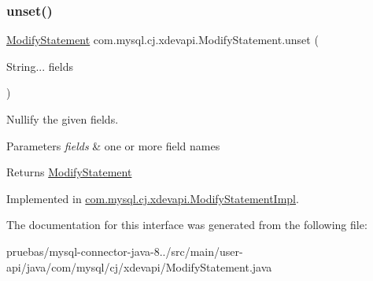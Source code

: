 \subsubsection{\texorpdfstring{unset()}{unset()}}
{\footnotesize\ttfamily \mbox{\hyperlink{interfacecom_1_1mysql_1_1cj_1_1xdevapi_1_1_modify_statement}{Modify\+Statement}} com.\+mysql.\+cj.\+xdevapi.\+Modify\+Statement.\+unset (\begin{DoxyParamCaption}\item[{String...}]{fields }\end{DoxyParamCaption})}

Nullify the given fields.


\begin{DoxyParams}{Parameters}
{\em fields} & one or more field names \\
\hline
\end{DoxyParams}
\begin{DoxyReturn}{Returns}
\mbox{\hyperlink{interfacecom_1_1mysql_1_1cj_1_1xdevapi_1_1_modify_statement}{Modify\+Statement}} 
\end{DoxyReturn}


Implemented in \mbox{\hyperlink{classcom_1_1mysql_1_1cj_1_1xdevapi_1_1_modify_statement_impl_ae2479079b83bdbefcabdf68380467a6d}{com.\+mysql.\+cj.\+xdevapi.\+Modify\+Statement\+Impl}}.



The documentation for this interface was generated from the following file\+:\begin{DoxyCompactItemize}
\item 
pruebas/mysql-\/connector-\/java-\/8../src/main/user-\/api/java/com/mysql/cj/xdevapi/Modify\+Statement.\+java\end{DoxyCompactItemize}
